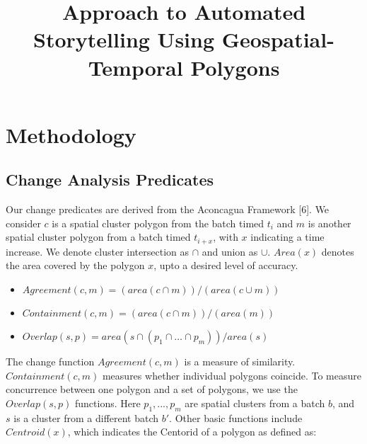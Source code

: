 \documentclass[conference]{IEEEtran}
\begin{document}
\title{Approach to Automated Storytelling Using Geospatial-Temporal Polygons}
\author{
\and
{}
}
\maketitle

\section{Methodology}


\subsection{Change Analysis Predicates}

Our change predicates are derived from the Aconcagua Framework [6]. We consider $c$ is a spatial cluster polygon from the batch timed $t_i$ and $m$ is another spatial cluster polygon from a batch timed $t_{i+x}$, with $x$ indicating a time increase. We denote cluster intersection as $\cap$ and union as $\cup$. $Area(x)$ denotes the area covered by the polygon $x$, upto a desired level of accuracy.

\begin{itemize}
	\item $Agreement (c, m) = (area(c\cap m))/(area(c\cup m))$
	\item $Containment (c, m) = (area(c\cap m))/(area(m))$
	\item $Overlap(s,p)= area(s\cap (p_1\cap …\cap p_m))/area(s)$
\end{itemize}

The change function $Agreement(c, m)$ is a measure of similarity. $Containment(c, m)$ measures whether individual polygons coincide. To measure concurrence between one polygon and a set of polygons, we use the $Overlap(s,p)$ functions. Here $p_1,...,p_m$ are spatial clusters from a batch $b$, and $s$ is a cluster from a different batch $b'$. Other basic functions include $Centroid(x)$, which indicates the Centorid of a polygon as defined as:
\end{document}
